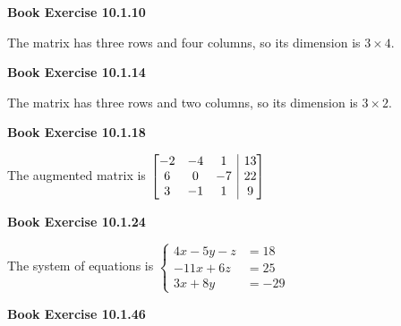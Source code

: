 \documentclass[12pt]{letter}
\author{Jacob Ayers}
\makeatletter
\newenvironment{amatrix}[1]{%
	\left[\begin{array}{@{}*{#1}{c}|c@{}}
	}{%
	\end{array}\right]
}
\newcommand{\?}{\stackrel{?}{=}}
\newenvironment{bex}[2][] {
	\begin{framed}
		\textbf{Book Exercise {#2}}#1
	\end{framed}
}
\makeatother
\begin{document}
	\begin{bex}{10.1.10}
		{
			
		}
	\end{bex} \vspace{-8pt}
	
	The matrix has three rows and four columns, so its dimension is $3 \times 4$.
	
	\vfill %
	
	\begin{bex}{10.1.14}
		{
			
		}
	\end{bex} \vspace{-8pt}
	
	The matrix has three rows and two columns, so its dimension is $3 \times 2$.
	
	\vfill %
	
	\begin{bex}{10.1.18}
		{
			
		}
	\end{bex} \vspace{-8pt}
	
	The augmented matrix is $\begin{amatrix}{3}
	-2 & -4 & 1 & 13 \\ 6 & 0 & -7 & 22 \\ 3 & -1 & 1 & 9
	\end{amatrix}$
	
	\vfill %
	
	\begin{bex}{10.1.24}
		{
			
		}
	\end{bex} \vspace{-8pt}
	
	The system of equations is $\begin{cases}
	4x - 5y - z &= 18 \\ -11x + 6z &= 25 \\ 3x + 8y &= -29
	\end{cases}$
	
	\vfill %
	
	\begin{bex}{10.1.46}
		{
			
		}
	\end{bex} \vspace{-32pt}
	
\end{document}
